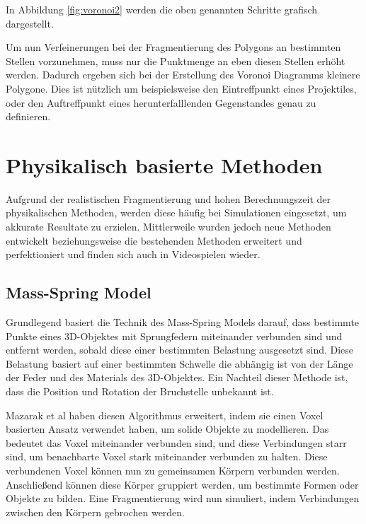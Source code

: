 In Abbildung \ref{fig:voronoi2} werden die oben genannten Schritte grafisch dargestellt.

Um nun Verfeinerungen bei der Fragmentierung des Polygons an bestimmten Stellen vorzunehmen, muss nur die Punktmenge an eben diesen Stellen erhöht werden. Dadurch ergeben
sich bei der Erstellung des Voronoi Diagramms kleinere Polygone. Dies ist nützlich um beispielsweise den Eintreffpunkt eines Projektiles, oder 
den Auftreffpunkt eines herunterfalllenden Gegenstandes genau zu definieren. 






\section{Physikalisch basierte Methoden}

Aufgrund der realistischen Fragmentierung und hohen Berechnungszeit der physikalischen Methoden, werden diese häufig bei Simulationen eingesetzt,
um akkurate Resultate zu erzielen. Mittlerweile wurden jedoch neue Methoden entwickelt beziehungsweise die bestehenden Methoden erweitert und perfektioniert 
und finden sich auch in Videospielen wieder. 

\subsection{Mass-Spring Model}

Grundlegend basiert die Technik des Mass-Spring Models darauf, dass bestimmte Punkte eines 3D-Objektes mit Sprungfedern miteinander verbunden sind und entfernt werden, 
sobald diese einer bestimmten Belastung ausgesetzt sind. 
Diese Belastung basiert auf einer bestimmten Schwelle die abhängig ist von der Länge der Feder und des Materials des 3D-Objektes. Ein Nachteil dieser Methode ist,
dass die Position und Rotation der Bruchstelle unbekannt ist.

Mazarak et al \cite{Mazarak.AnimatingExplodingObjects} haben diesen Algorithmus erweitert, indem sie einen Voxel basierten Ansatz verwendet haben,
um solide Objekte zu modellieren. Das bedeutet das Voxel miteinander verbunden sind, und diese Verbindungen starr sind, um benachbarte 
Voxel stark miteinander verbunden zu halten. 
Diese verbundenen Voxel können nun zu gemeinsamen Körpern verbunden werden. Anschließend können diese Körper gruppiert werden, um bestimmte Formen oder Objekte zu bilden.
Eine Fragmentierung wird nun simuliert, indem Verbindungen zwischen den Körpern gebrochen werden.

